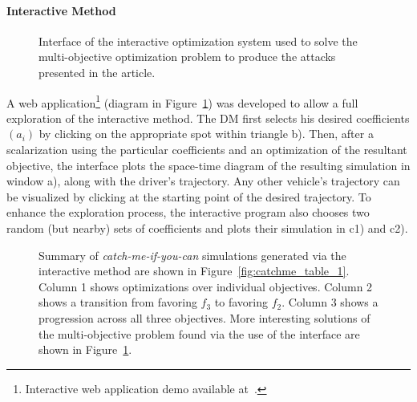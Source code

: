 \paragraph{Interactive Method}


\begin{figure}[t]
\centering
{}%
%

\caption{Interface of the interactive optimization system used to solve the multi-objective optimization problem to produce the attacks presented in the article.}

\label{fig:webinterface}
\end{figure}

 A web application\footnote{Interactive web application demo available at~\cite{smartroadswebsite}.} (diagram in Figure~\ref{fig:webinterface}) was developed to allow a full exploration of the interactive method. The DM first selects his desired coefficients $(a_i)$ by clicking on the appropriate spot within triangle b). Then, after a scalarization using the particular coefficients and an optimization of the resultant objective, the interface plots the space-time diagram of the resulting simulation in window a), along with the driver's trajectory. Any other vehicle's trajectory can be visualized by clicking at the starting point of the desired trajectory. To enhance the exploration process, the interactive program also chooses two random (but nearby) sets of coefficients and plots their simulation in c1) and c2).

\begin{figure}[t]
    \centering
    \hfill
    \caption[Summary of \emph{catch-me-if-you-can} simulations generated via the interactive method.]{Summary of \emph{catch-me-if-you-can} simulations generated via the interactive method are shown in Figure~\ref{fig:catchme_table_1}. Column 1 shows optimizations over individual objectives. Column 2 shows a transition from favoring $f_3$ to favoring $f_2$. Column 3 shows a progression across all three objectives. More interesting solutions of the multi-objective problem found via the use of the interface are shown in Figure~\ref{fig:webinterface}.}    
\end{figure}

